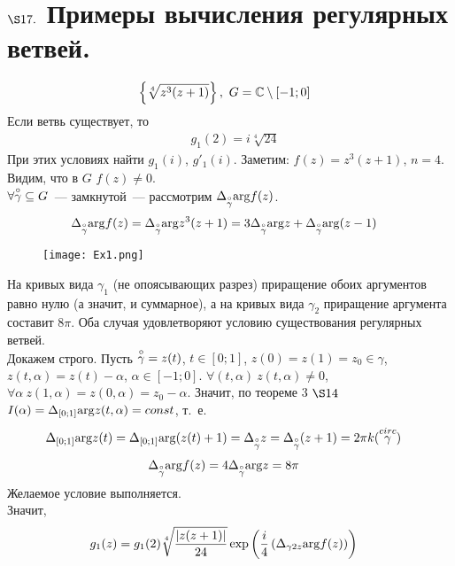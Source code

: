 \section{$\S 17.$ Примеры вычисления регулярных ветвей.}
\Example
\begin{align*}
  & \left\{ \sqrt[4]{z^3(z+1)} \right\}, \ G = \mathbb{C} \setminus[-1;0]
\end{align*}
Если ветвь существует, то
\begin{align*}
  & g_1(2) = i \sqrt[4]{24}
\end{align*}
При этих условиях найти $g_1(i)$, $g'_1(i)$.
\nonum
Заметим: $f(z) = z^3(z+1)$, $n=4$. Видим, что в $G$ $f(z) \neq 0$.
\\
$\forall \overset{\circ}{\gamma} \subseteq G$~--- замкнутой~--- рассмотрим
$\Delta_{\overset{\circ}{\gamma}}\mathrm{arg} f(z)$.
\begin{align*}
  & \Delta_{\overset{\circ}{\gamma}}\mathrm{arg} f(z) = \Delta_{\overset{\circ}{\gamma}}\mathrm{arg} z^3(z+1) = 3 \Delta_{\overset{\circ}{\gamma}}\mathrm{arg} z + \Delta_{\overset{\circ}{\gamma}}\mathrm{arg} (z-1)
\end{align*}
\begin{figure}[h!]
		\centering
		\texttt{[image: Ex1.png]}
		\label{fig:17.1}
\end{figure}
На кривых вида $\gamma_1$ (не опоясывающих разрез) приращение обоих аргументов
равно нулю (а значит, и суммарное), а на кривых вида $\gamma_2$ приращение
аргумента составит $8 \pi$. Оба случая удовлетворяют условию существования
регулярных ветвей.
\\
Докажем строго. Пусть $\overset{\circ}{\gamma} = z(t)$, $t \in [0;1]$, $z(0) = z(1) =
z_0 \in \gamma$, $z(t, \alpha) = z(t) - \alpha$, $\alpha \in [-1;0]$. $\forall
(t, \alpha) \ z(t, \alpha) \neq 0$, $\forall \alpha \ z(1, \alpha) = z(0,
\alpha) = z_0 - \alpha$. Значит, по теореме $3$ $\S 14$ $I(\alpha) =
\Delta_{[0;1]}\mathrm{arg} z(t, \alpha) = const$, т.~е.
\begin{align*}
  & \Delta_{[0;1]} \mathrm{arg} z(t) = \Delta_{[0;1]} \mathrm{arg}(z(t) + 1) = \Delta_{\overset{\circ}{\gamma}}z = \Delta_{\overset{\circ}{\gamma}}(z+1) = 2 \pi k(\overset{circ}{\gamma})
\end{align*}
\begin{align*}
  & \Delta_{\overset{\circ}{\gamma}} \mathrm{arg} f(z) = 4 \Delta_{\overset{\circ}{\gamma}} \mathrm{arg} z = 8 \pi
\end{align*}
Желаемое условие выполняется.
\\
Значит,
\begin{align*}
  & g_1(z) = g_1(2) \sqrt[4]{\frac{\left| z(z+1) \right|}{24}} \exp \left( \frac{i}{4}\left( \Delta_{\gamma{2z}}\mathrm{arg} f(z) \right) \right)
\end{align*}
